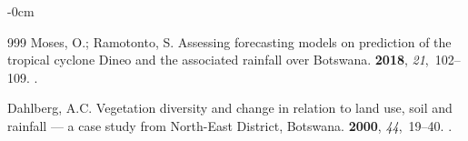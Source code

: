 \documentclass[ijgi,article,accept,pdftex,moreauthors]{Definitions/mdpi}
\begin{document}
\begin{adjustwidth}{-\extralength}{0cm}
\begin{thebibliography}{999}
Moses, O.; Ramotonto, S.
\newblock Assessing forecasting models on prediction of the tropical cyclone
  Dineo and the associated rainfall over Botswana.
 {\bf 2018}, {\em 21},~102--109.
.

Dahlberg, A.C.
\newblock Vegetation diversity and change in relation to land use, soil and
  rainfall — a case study from North-East District, Botswana.
 {\bf 2000}, {\em 44},~19--40.
.

\end{thebibliography}

\end{adjustwidth}


%

%
\end{document}
